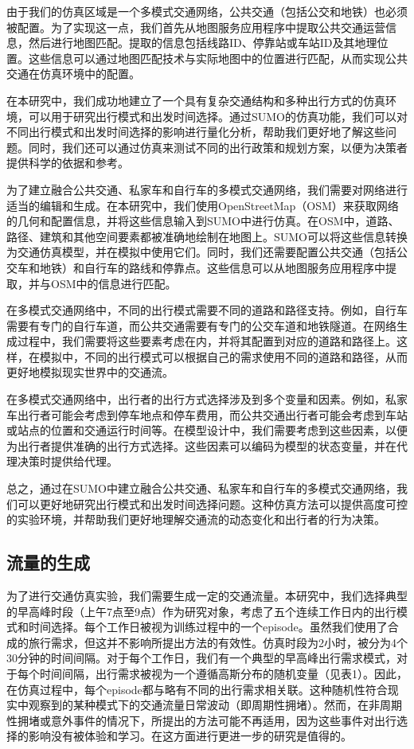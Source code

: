 由于我们的仿真区域是一个多模式交通网络，公共交通（包括公交和地铁）也必须被配置。为了实现这一点，我们首先从地图服务应用程序中提取公共交通运营信息，然后进行地图匹配。提取的信息包括线路ID、停靠站或车站ID及其地理位置。这些信息可以通过地图匹配技术与实际地图中的位置进行匹配，从而实现公共交通在仿真环境中的配置。

在本研究中，我们成功地建立了一个具有复杂交通结构和多种出行方式的仿真环境，可以用于研究出行模式和出发时间选择。通过SUMO的仿真功能，我们可以对不同出行模式和出发时间选择的影响进行量化分析，帮助我们更好地了解这些问题。同时，我们还可以通过仿真来测试不同的出行政策和规划方案，以便为决策者提供科学的依据和参考。

为了建立融合公共交通、私家车和自行车的多模式交通网络，我们需要对网络进行适当的编辑和生成。在本研究中，我们使用OpenStreetMap（OSM）来获取网络的几何和配置信息，并将这些信息输入到SUMO中进行仿真。在OSM中，道路、路径、建筑和其他空间要素都被准确地绘制在地图上。SUMO可以将这些信息转换为交通仿真模型，并在模拟中使用它们。同时，我们还需要配置公共交通（包括公交车和地铁）和自行车的路线和停靠点。这些信息可以从地图服务应用程序中提取，并与OSM中的信息进行匹配。

在多模式交通网络中，不同的出行模式需要不同的道路和路径支持。例如，自行车需要有专门的自行车道，而公共交通需要有专门的公交车道和地铁隧道。在网络生成过程中，我们需要将这些要素考虑在内，并将其配置到对应的道路和路径上。这样，在模拟中，不同的出行模式可以根据自己的需求使用不同的道路和路径，从而更好地模拟现实世界中的交通流。

在多模式交通网络中，出行者的出行方式选择涉及到多个变量和因素。例如，私家车出行者可能会考虑到停车地点和停车费用，而公共交通出行者可能会考虑到车站或站点的位置和交通运行时间等。在模型设计中，我们需要考虑到这些因素，以便为出行者提供准确的出行方式选择。这些因素可以编码为模型的状态变量，并在代理决策时提供给代理。

总之，通过在SUMO中建立融合公共交通、私家车和自行车的多模式交通网络，我们可以更好地研究出行模式和出发时间选择问题。这种仿真方法可以提供高度可控的实验环境，并帮助我们更好地理解交通流的动态变化和出行者的行为决策。

\subsection{流量的生成}
为了进行交通仿真实验，我们需要生成一定的交通流量。本研究中，我们选择典型的早高峰时段（上午7点至9点）作为研究对象，考虑了五个连续工作日内的出行模式和时间选择。每个工作日被视为训练过程中的一个episode。虽然我们使用了合成的旅行需求，但这并不影响所提出方法的有效性。仿真时段为2小时，被分为4个30分钟的时间间隔。对于每个工作日，我们有一个典型的早高峰出行需求模式，对于每个时间间隔，出行需求被视为一个遵循高斯分布的随机变量（见表1）。因此，在仿真过程中，每个episode都与略有不同的出行需求相关联。这种随机性符合现实中观察到的某种模式下的交通流量日常波动（即周期性拥堵）。然而，在非周期性拥堵或意外事件的情况下，所提出的方法可能不再适用，因为这些事件对出行选择的影响没有被体验和学习。在这方面进行更进一步的研究是值得的。


